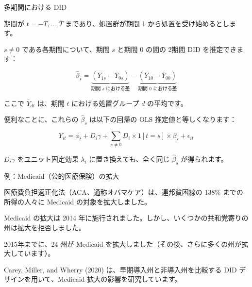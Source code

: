\documentclass[11pt,handout]{beamer}
\newenvironment{wideitemize}{\itemize\addtolength{\itemsep}{10pt}}{\enditemize}
\begin{document}
\begin{frame}{多期間における DID}
	\begin{wideitemize}
		\item
		期間が $t=-\underline{T},...,\bar{T}$ まであり、処置群が期間 1 から処置を受け始めるとします。
		
		\pause
		\item
		$s \neq 0$ である各期間について、期間 $s$ と期間 0 の間の 2期間 DID を推定できます：
		
		$$\hat\beta_s = \underbrace{(\bar{Y}_{1s} - \bar{Y}_{0s})}_{\text{期間 $s$ における差}} -  \underbrace{(\bar{Y}_{10} - \bar{Y}_{00})}_{\text{期間 0 における差}} $$
		
		\noindent ここで $\bar{Y}_{dt}$ は、期間 $t$ における処置グループ $d$ の平均です。
		
		\pause
		\item
		便利なことに、これらの $\hat\beta_s$ は以下の回帰の OLS 推定値と等しくなります：
		
		$$Y_{it} =  \phi_{t} + D_i \gamma + \sum_{s\neq 0}  D_i \times 1[t = s] \times  \beta_s   + \epsilon_{it} $$
		
		\pause
		\item
		$D_i \gamma$ をユニット固定効果 $\lambda_i$ に置き換えても、全く同じ $\hat\beta_s$ が得られます。 
		\end{wideitemize}
\end{frame}

\begin{frame}{例：Medicaid（公的医療保険）の拡大}
	
	\begin{wideitemize}
		\item
		医療費負担適正化法（ACA、通称オバマケア）は、連邦貧困線の 138\% までの所得の人々に Medicaid の対象を拡大しました。
		
		\item
		Medicaid の拡大は 2014 年に施行されました。しかし、いくつかの共和党寄りの州は拡大を拒否しました。
		
		\item
		2015年までに、24 州が Medicaid を拡大しました（その後、さらに多くの州が拡大しています）。
		
		\pause
		\item
		Carey, Miller, and Wherry (2020) は、早期導入州と非導入州を比較する DID デザインを用いて、Medicaid 拡大の影響を研究しています。
				
		
	\end{wideitemize}
	
\end{frame}
\end{document}
